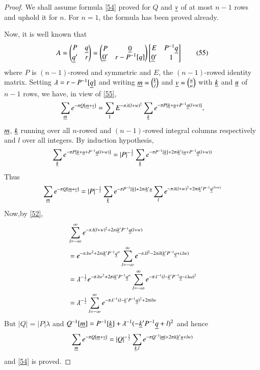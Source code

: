 \begin{proof}
We shall assume formula \eqref{54} proved for $Q$ and $\underline{v}$ of at
most $n-1$ rows and uphold it for $n$. For $n=1$, the formula has been
proved already.

Now, it is well known that
\begin{equation*}
A=
\begin{pmatrix}
P & \underline{q}\\
\underline{q}' & r
\end{pmatrix}
=
\begin{pmatrix}
P & \underline{0}\\
\underline{0}' & r-P^{-1}[q]
\end{pmatrix}
\begin{bmatrix}
E & P^{-1}\underline{q}\\
\underline{0}' & 1
\end{bmatrix}
\tag{55}\label{55}
\end{equation*}
where $P$ is $(n-1)$-rowed and symmetric and $E$, the $(n-1)$-rowed
identity matrix. Setting $\lambda=r-P^{-1}[\underline{q}]$ and writing
$\underline{m}=\binom{\underline{k}}{l}$ and $\underline{v}=\binom{\underline{u}}{w}$ with
$\underline{k}$ and $\underline{u}$ of $n-1$ rows, we have, in view of \eqref{55}, 
$$
\sum_{\underline{m}}e^{-\pi
  Q[\underline{m}+\underline{v}]}=\sum_{1}E^{-\pi\lambda(l+w)^{2}}\sum_{\underline{k}}e^{-\pi
  P[\underline{k}+\underline{u}+P^{-1}\underline{q}(l+w)]}, 
$$
$\underline{m}$, $\underline{k}$ running over all $n$-rowed and $(n-1)$-rowed
integral columns respectively and $l$ over all integers. By induction
hypothesis, 
$$
\sum_{\underline{k}}e^{-\pi
  P[\underline{k}+\underline{u}+P^{-1}\underline{q}(l+w)]}=|P|^{-\frac{1}{2}}\sum_{\underline{k}}e^{-\pi
  P^{-1}[\underline{k}]+2\pi i\underline{k}'(\underline{u}+P^{-1}\underline{q}(l+w))} 
$$
Thus
$$
\sum_{\underline{m}}e^{-\pi
  Q[\underline{m}+\underline{v}]}=|P|^{-\frac{1}{2}}\sum_{\underline{k}} e^{-\pi
  P^{-1}[\underline{k}]+2\pi i\underline{k}'\underline{u} } \sum_{l}e^{-\pi
  \lambda(l+w)^{2}+2\pi i\underline{k}'P^{-1}\underline{q}^{(l+w)}} 
$$
Now,\pageoriginale by \eqref{52},
\begin{align*}
& \sum^{\infty}_{l=-\infty}e^{-\pi\lambda(l+w)^{2}+2\pi i
  \underline{k}'P^{-1}\underline{q}(l+w)}\\
&= e^{-\pi \lambda w^{2}+2\pi
    i\underline{k}'P^{-1}\underline{q}^{w}}\sum^{\infty}_{l=-\infty}e^{-\pi\lambda
    l^{2}-2\pi il(\underline{k}'P^{-1}\underline{q}+i\lambda w)}\\
&= \lambda^{-\frac{1}{2}}e^{-\pi \lambda w^{2}+2\pi
    i\underline{k}'P^{-1}\underline{q}^{w}}\sum^{\infty}_{l=-\infty}e^{-\pi\lambda^{-1}(l-\underline{k}'P^{-1}\underline{q}-i\lambda\omega)^{2}}\\
&=
  \lambda^{-\frac{1}{2}}\sum^{\infty}_{l=-\infty}e^{-\pi\lambda^{-1}(l-\underline{k}'P^{-1}\underline{q})^{2}+2\pi ilw} 
\end{align*}
But $|Q|=|P|\lambda$ and
$Q^{-1}[\underline{m}]=P^{-1}[\underline{k}]+\lambda^{-1}(-\underline{k}'P^{-1}\underline{q}+l)^{2}$
and hence
$$
\sum_{\underline{m}}e^{-\pi
  Q[\underline{m}+\underline{v}]}=|Q|^{-\frac{1}{2}}\sum_{\underline{k},l}e^{-\pi
  Q^{-1}|\underline{m}|+2\pi i(\underline{k}'\underline{u}+lw)} 
$$
and \eqref{54} is proved.
\end{proof}

